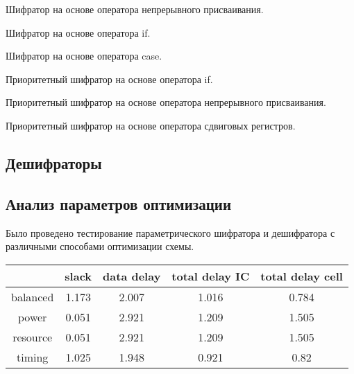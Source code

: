 \documentclass[a4paper,14pt]{article}
\begin{document}
Шифратор на основе оператора непрерывного присваивания.

Шифратор на основе оператора if.

Шифратор на основе оператора case.

Приоритетный шифратор на основе оператора if.

Приоритетный шифратор на основе оператора непрерывного присваивания.

Приоритетный шифратор на основе оператора сдвиговых регистров.

\subsection{Дешифраторы}


\subsection{Анализ параметров оптимизации}

Было проведено тестирование параметрического шифратора и дешифратора с различными способами оптимизации схемы.

\begin{table}[H]
	\begin{center}
		\begin{flushleft}
		\end{flushleft}
		\label{tab:encdoder}
		\begin{tabular}{|c|c|c|c|c|}
			\hline
			& slack & data delay & total delay IC & total delay cell \\ \hline
			balanced & 1.173 & 2.007      & 1.016          & 0.784            \\ \hline
			power    & 0.051 & 2.921      & 1.209          & 1.505            \\ \hline
			resource & 0.051 & 2.921      & 1.209          & 1.505            \\ \hline
			timing   & 1.025 & 1.948      & 0.921          & 0.82             \\ \hline
		\end{tabular}
	\end{center}
\end{table}
\end{document}
